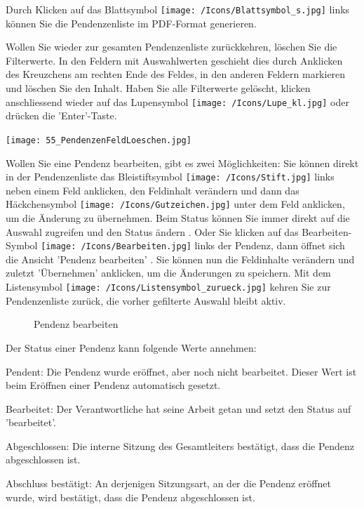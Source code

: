 Durch Klicken auf das Blattsymbol \texttt{[image: /Icons/Blattsymbol\_s.jpg]}  links können Sie die Pendenzenliste im PDF-Format generieren.

\vspace{\baselineskip}

Wollen Sie wieder zur gesamten Pendenzenliste zurückkehren, löschen Sie die Filterwerte. In den Feldern mit Auswahlwerten geschieht dies durch Anklicken des Kreuzchens  am rechten Ende des Feldes, in den anderen Feldern markieren und löschen Sie den Inhalt. Haben Sie alle Filterwerte gelöscht, klicken anschliessend wieder auf das Lupensymbol \texttt{[image: /Icons/Lupe\_kl.jpg]}  oder drücken die 'Enter'-Taste.

\begin{center}
\texttt{[image: 55\_PendenzenFeldLoeschen.jpg]}
\end{center}

Wollen Sie eine Pendenz bearbeiten, gibt es zwei Möglichkeiten: Sie können direkt in der Pendenzenliste das Bleistiftsymbol \texttt{[image: /Icons/Stift.jpg]}  links neben einem Feld anklicken, den Feldinhalt verändern und dann das Häckchensymbol \texttt{[image: /Icons/Gutzeichen.jpg]}  unter dem Feld anklicken, um die Änderung zu übernehmen. Beim Status können Sie immer direkt auf die Auswahl zugreifen und den Status ändern . Oder Sie klicken auf das Bearbeiten-Symbol \texttt{[image: /Icons/Bearbeiten.jpg]}  links der Pendenz, dann öffnet sich die Ansicht 'Pendenz bearbeiten' . Sie können nun die Feldinhalte verändern und zuletzt 'Übernehmen' anklicken, um die Änderungen zu speichern. Mit dem Listensymbol \texttt{[image: /Icons/Listensymbol\_zurueck.jpg]}  kehren Sie zur Pendenzenliste zurück, die vorher gefilterte Auswahl bleibt aktiv.


\begin{figure}[H]
\caption{Pendenz bearbeiten}
\end{figure}

Der Status einer Pendenz kann folgende Werte annehmen:

\begin{compactitem}
\item
Pendent: Die Pendenz wurde eröffnet, aber noch nicht bearbeitet. Dieser Wert ist beim Eröffnen einer Pendenz automatisch gesetzt.
\item
Bearbeitet: Der Verantwortliche hat seine Arbeit getan und setzt den Status auf 'bearbeitet'.
\item
Abgeschlossen: Die interne Sitzung des Gesamtleiters bestätigt, dass die Pendenz abgeschlossen ist.
\item
Abschluss bestätigt: An derjenigen Sitzungsart, an der die Pendenz eröffnet wurde, wird bestätigt, dass die Pendenz
abgeschlossen ist.
\end{compactitem}

